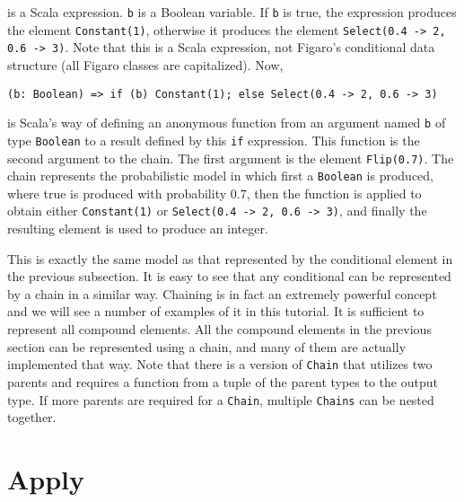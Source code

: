 is a Scala expression. \texttt{b} is a Boolean variable. If \texttt{b} is true, the expression produces the element \texttt{Constant(1)}, otherwise it produces the element \texttt{Select(0.4 -> 2, 0.6 -> 3)}. Note that this is a Scala expression, not Figaro's conditional data structure (all Figaro classes are capitalized). Now,
 
\begin{flushleft}
\texttt{(b: Boolean) =>
\newline \tab if (b) Constant(1); else Select(0.4 -> 2, 0.6 -> 3)}
\end{flushleft}

is Scala's way of defining an anonymous function from an argument named \texttt{b} of type \texttt{Boolean} to a result defined by this \texttt{if} expression. This function is the second argument to the chain. The first argument is the element \texttt{Flip(0.7)}. The chain represents the probabilistic model in which first a \texttt{Boolean} is produced, where true is produced with probability 0.7, then the function is applied to obtain either \texttt{Constant(1)} or \texttt{Select(0.4 -> 2, 0.6 -> 3)}, and finally the resulting element is used to produce an integer.

This is exactly the same model as that represented by the conditional element in the previous subsection. It is easy to see that any conditional can be represented by a chain in a similar way. Chaining is in fact an extremely powerful concept and we will see a number of examples of it in this tutorial. It is sufficient to represent all compound elements. All the compound elements in the previous section can be
represented using a chain, and many of them are actually implemented that way. Note that there is a version of \texttt{Chain} that utilizes two parents and requires a function from a tuple of the parent types to the output type. If more parents are required for a \texttt{Chain}, multiple \texttt{Chains} can be nested together.

\section{Apply}

